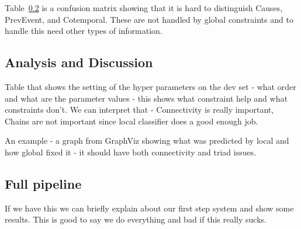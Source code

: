 Table~\ref{} is a confusion matrix showing that it is hard to distinguish Causes, PrevEvent, and Cotemporal. These are not handled by global constraints and to handle this need other types of information.

\subsection{Analysis and Discussion}

Table that shows the setting of the hyper parameters on the dev set  - what order and what are the parameter values - this shows what constraint help and what constraints don't. We can interpret that - Connectivity is really important, Chains are not important since local classifier does a good enough job.

An example - a graph from GraphViz showing what was predicted by local and how global fixed it - it should have both connectivity and triad issues.

\subsection{Full pipeline}

If we have this we can briefly explain about our first step system and show some results. This is good to say we do everything and bad if this really sucks.

